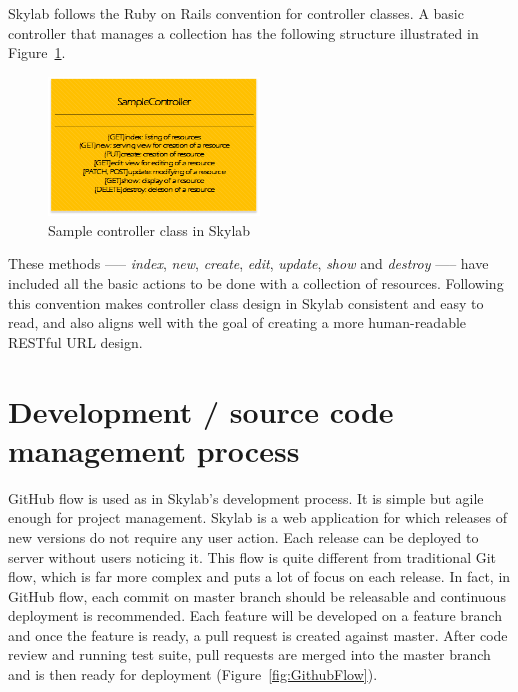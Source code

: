 Skylab follows the Ruby on Rails convention for controller classes. A basic controller that manages a collection has the following structure illustrated in Figure~\ref{fig:SkylabSampleController}.

\begin{figure}[h]
  \centering
  \includegraphics[width=0.5\textwidth]{Images/Skylab_Sample_Controller.png}
  \caption{Sample controller class in Skylab}
  \label{fig:SkylabSampleController}
\end{figure}

These methods —-- \textit{index}, \textit{new}, \textit{create}, \textit{edit}, \textit{update}, \textit{show} and \textit{destroy} —-- have included all the basic actions to be done with a collection of resources. Following this convention makes controller class design in Skylab consistent and easy to read, and also aligns well with the goal of creating a more human-readable RESTful URL design.

\section{Development / source code management process}

GitHub flow is used as in Skylab's development process. It is simple but agile enough for project management. Skylab is a web application for which releases of new versions do not require any user action. Each release can be deployed to server without users noticing it. This flow is quite different from traditional Git flow, which is far more complex and puts a lot of focus on each release\cite{citation8}. In fact, in GitHub flow, each commit on master branch should be releasable and continuous deployment is recommended\cite{citation8}. Each feature will be developed on a feature branch and once the feature is ready, a pull request is created against master. After code review and running test suite, pull requests are merged into the master branch and is then ready for deployment (Figure~\ref{fig:GithubFlow}).

